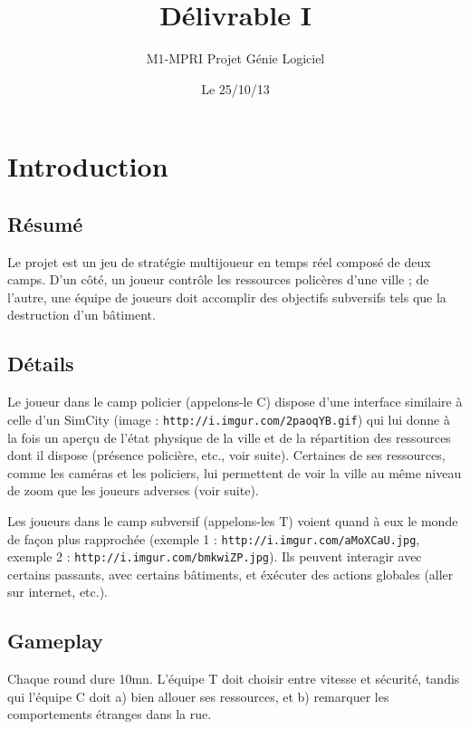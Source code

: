 \documentclass[a4paper,10pt]{article}
\author{M1-MPRI Projet Génie Logiciel}
\date{Le 25/10/13}
\title{Délivrable I
}
\begin{document}
\maketitle
\tableofcontents

\section{Introduction}

\subsection{Résumé}

Le projet est un jeu de stratégie multijoueur en temps réel composé de deux camps. D'un côté, un joueur contrôle les ressources policères d'une ville ; de l'autre, une équipe de joueurs doit accomplir des objectifs subversifs tels que la destruction d'un bâtiment.

\subsection{Détails}

Le joueur dans le camp policier (appelons-le C) dispose d'une interface similaire à celle d'un SimCity (image : \texttt{http://i.imgur.com/2paoqYB.gif}) qui lui donne à la fois un aperçu de l'état physique de la ville et de la répartition des ressources dont il dispose (présence policière, etc., voir suite). Certaines de ses ressources, comme les caméras et les policiers, lui permettent de voir la ville au même niveau de zoom que les joueurs adverses (voir suite).

Les joueurs dans le camp subversif (appelons-les T) voient quand à eux le monde de façon plus rapprochée (exemple 1 : \texttt{http://i.imgur.com/aMoXCaU.jpg}, exemple 2 : \texttt{http://i.imgur.com/bmkwiZP.jpg}). Ils peuvent interagir avec certains passants, avec certains bâtiments, et éxécuter des actions globales (aller sur internet, etc.).

\subsection{Gameplay}


Chaque round dure 10mn. L'équipe T doit choisir entre vitesse et sécurité, tandis qui l'équipe C doit a) bien allouer ses ressources, et b) remarquer les comportements étranges dans la rue.
\end{document}
